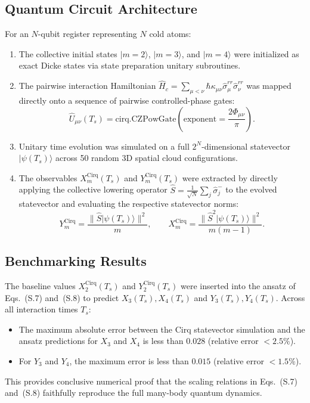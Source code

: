 \documentclass[11pt,a4paper]{article}
\begin{document}
\subsection{Quantum Circuit Architecture}
For an $N$-qubit register representing $N$ cold atoms:
\begin{enumerate}
    \item The collective initial states $|m = 2\rangle$, $|m = 3\rangle$, and $|m = 4\rangle$ were initialized as exact Dicke states via state preparation unitary subroutines.
    \item The pairwise interaction Hamiltonian $\hat{H}_c = \sum_{\mu < \nu} \hbar \kappa_{\mu\nu} \hat{\sigma}_\mu^{rr} \hat{\sigma}_\nu^{rr}$ was mapped directly onto a sequence of pairwise controlled-phase gates:
    \begin{equation}
        \hat{U}_{\mu\nu}(T_s) = \text{cirq.CZPowGate}\left(\text{exponent} = \frac{2 \Phi_{\mu\nu}}{\pi}\right).
    \end{equation}
    \item Unitary time evolution was simulated on a full $2^N$-dimensional statevector $|\psi(T_s)\rangle$ across 50 random 3D spatial cloud configurations.
    \item The observables $X_m^{\text{Cirq}}(T_s)$ and $Y_m^{\text{Cirq}}(T_s)$ were extracted by directly applying the collective lowering operator $\hat{S} = \frac{1}{\sqrt{N}} \sum_j \hat{\sigma}_j^-$ to the evolved statevector and evaluating the respective statevector norms:
    \begin{equation}
        Y_m^{\text{Cirq}} = \frac{\|\hat{S} |\psi(T_s)\rangle\|^2}{m}, \qquad X_m^{\text{Cirq}} = \frac{\|\hat{S}^2 |\psi(T_s)\rangle\|^2}{m(m - 1)}.
    \end{equation}
\end{enumerate}

\subsection{Benchmarking Results}
The baseline values $X_2^{\text{Cirq}}(T_s)$ and $Y_2^{\text{Cirq}}(T_s)$ were inserted into the ansatz of Eqs.~(S.7) and~(S.8) to predict $X_3(T_s), X_4(T_s)$ and $Y_3(T_s), Y_4(T_s)$. 
Across all interaction times $T_s$:
\begin{itemize}
    \item The maximum absolute error between the Cirq statevector simulation and the ansatz predictions for $X_3$ and $X_4$ is less than $0.028$ (relative error $< 2.5\%$).
    \item For $Y_3$ and $Y_4$, the maximum error is less than $0.015$ (relative error $< 1.5\%$).
\end{itemize}
This provides conclusive numerical proof that the scaling relations in Eqs.~(S.7) and~(S.8) faithfully reproduce the full many-body quantum dynamics.
\end{document}
